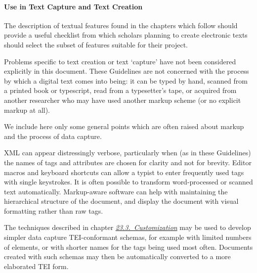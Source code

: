 \paragraph[{Use in Text Capture and Text Creation}]{Use in Text Capture and Text Creation}\label{ABAPP1}\par
The description of textual features found in the chapters which follow should provide a useful checklist from which scholars planning to create electronic texts should select the subset of features suitable for their project. \par
Problems specific to text creation or text ‘capture’ have not been considered explicitly in this document. These Guidelines are not concerned with the process by which a digital text comes into being: it can be typed by hand, scanned from a printed book or typescript, read from a typesetter's tape, or acquired from another researcher who may have used another markup scheme (or no explicit markup at all).\par
We include here only some general points which are often raised about markup and the process of data capture.\par
XML can appear distressingly verbose, particularly when (as in these Guidelines) the names of tags and attributes are chosen for clarity and not for brevity. Editor macros and keyboard shortcuts can allow a typist to enter frequently used tags with single keystrokes. It is often possible to transform word-processed or scanned text automatically. Markup-aware software can help with maintaining the hierarchical structure of the document, and display the document with visual formatting rather than raw tags.\par
The techniques described in chapter \textit{\hyperref[MD]{23.3.\ Customization}} may be used to develop simpler data capture TEI-conformant schemas, for example with limited numbers of elements, or with shorter names for the tags being used most often. Documents created with such schemas may then be automatically converted to a more elaborated TEI form.
